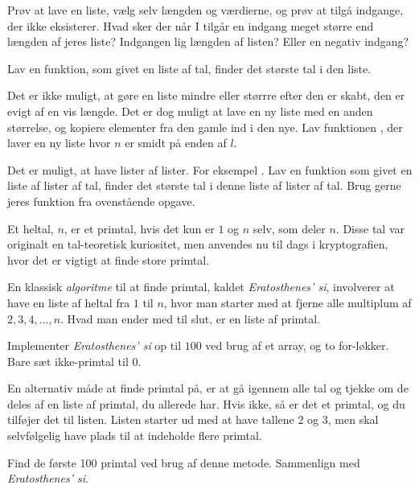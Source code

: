 	\begin{exercise}
        Prøv at lave en liste, vælg selv længden og værdierne, og prøv
        at tilgå indgange, der ikke eksisterer. Hvad sker der når I
        tilgår en indgang meget større end længden af jeres liste?
        Indgangen lig længden af listen? Eller en negativ indgang?
	\end{exercise}

	\begin{exercise}
		Lav en funktion, som givet en liste af tal, finder det største tal i den
		liste.
	\end{exercise}

    \begin{exercise}
        Det er ikke muligt, at gøre en liste mindre eller størrre efter
        den er skabt, den er evigt af en vis længde.  Det er dog
        muligt at lave en ny liste med en anden størrelse, og kopiere
        elementer fra den gamle ind i den nye.
        Lav funktionen ,
        der laver en ny liste hvor \(n\) er smidt på enden af \(l\).
    \end{exercise}

    \begin{exercise}
        Det er muligt, at have lister af lister. For eksempel
        .  Lav en funktion som givet en liste af
        lister af tal, finder det største tal i denne liste af lister
        af tal. Brug gerne jeres funktion fra ovenstående opgave.
    \end{exercise}

	\begin{exercise}
        Et heltal, \(n\), er et primtal, hvis det kun er \(1\) og \(n\)
        selv, som deler \(n\). Disse tal var originalt en tal-teoretisk
        kuriositet, men anvendes nu til dags i kryptografien, hvor det
        er vigtigt at finde store primtal.

        En klassisk \emph{algoritme} til at finde primtal, kaldet
        \emph{Eratosthenes' si}, involverer at have en liste af heltal
        fra \(1\) til \(n\), hvor man starter med at fjerne alle
        multiplum af \(2, 3, 4, \dots, n\). Hvad man ender med til
        slut, er en liste af primtal.

        Implementer \emph{Eratosthenes' si} op til \(100\) ved brug af
        et array, og to for-løkker. Bare sæt ikke-primtal til \(0\).
	\end{exercise}

    \begin{exercise}
        En alternativ måde at finde primtal på, er at gå igennem alle
        tal og tjekke om de deles af en liste af primtal, du allerede
        har. Hvis ikke, så er det et primtal, og du tilføjer det til
        listen. Listen starter ud med at have tallene \(2\) og \(3\),
        men skal selvfølgelig have plads til at indeholde flere
        primtal.

        Find de første 100 primtal ved brug af denne metode. Sammenlign
        med \emph{Eratosthenes' si}.
    \end{exercise}

